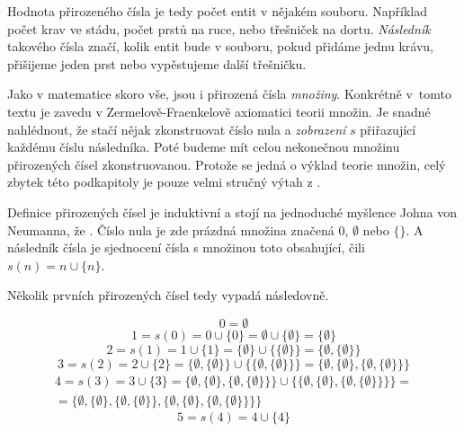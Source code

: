 Hodnota přirozeného čísla je tedy počet entit v nějakém souboru. Například počet krav ve stádu, počet prstů na ruce, nebo třešniček na dortu. \textit{Následník} takového čísla značí, kolik entit bude v souboru, pokud přidáme jednu krávu, přišijeme jeden prst nebo vypěstujeme další třešničku.

Jako v matematice skoro vše, jsou i přirozená čísla \textit{množiny}. Konkrétně v~tomto textu je zavedu v Zermelově-Fraenkelově axiomatici teorii množin. Je snadné nahlédnout, že stačí nějak zkonstruovat číslo nula a \textit{zobrazení} $s$ přiřazující každému číslu následníka. Poté budeme mít celou nekonečnou množinu přirozených čísel zkonstruovanou. Protože se jedná o výklad teorie množin, celý zbytek této podkapitoly je pouze velmi stručný výtah z \cite{TeMno}.

Definice přirozených čísel je induktivní a stojí na jednoduché myšlence Johna von Neumanna, že . Číslo nula je zde prázdná množina značená $0$, $\emptyset$ nebo $\{ \}$. A následník čísla je sjednocení čísla s množinou toto obsahující, čili $s(n) = n \cup \{n\}$.

Několik prvních přirozených čísel tedy vypadá následovně.
\begin{example}
\begin{equation}
0 = \emptyset
\end{equation}
\begin{equation}
1 = s(0) = 0 \cup \{ 0 \} = \emptyset \cup \{ \emptyset \} = \{ \emptyset \}
\end{equation}
\begin{equation}
2 = s(1)= 1 \cup \{ 1 \} = \{ \emptyset \} \cup \{ \{ \emptyset \} \} = \{ \emptyset , \{ \emptyset \} \}
\end{equation}
\begin{equation}
3 = s(2)= 2 \cup \{ 2 \} = \{ \emptyset , \{ \emptyset \} \} \cup \{ \{ \emptyset , \{ \emptyset \} \} \} = \{ \emptyset , \{ \emptyset \} , \{ \emptyset , \{ \emptyset \} \} \} 
\end{equation}
\begin{equation}
\begin{split}
4 =s(3)= 3 \cup \{ 3 \} = \{ \emptyset , \{ \emptyset \} , \{ \emptyset , \{ \emptyset \} \} \}  \cup \{ \{ \emptyset , \{ \emptyset \} , \{ \emptyset , \{ \emptyset \} \} \}  \} = \\ = \{ \emptyset , \{ \emptyset \} , \{ \emptyset , \{ \emptyset \} \} , \{ \emptyset , \{ \emptyset \} , \{ \emptyset , \{ \emptyset \} \} \}  \}
\end{split}
\end{equation}
\begin{equation}
5 =s(4)= 4 \cup \{ 4 \}
\end{equation}
\end{example}

